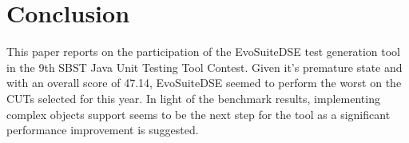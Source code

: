 \documentclass[conference]{IEEEtran}
\begin{document}
\section{Conclusion}
This paper reports on the participation of the EvoSuiteDSE test generation tool in the 9th SBST Java Unit Testing Tool Contest. Given it's premature state and with an overall score of 47.14, EvoSuiteDSE seemed to perform the worst on the CUTs selected for this year. In light of the benchmark results, implementing complex objects support seems to be the next step for the tool as a significant performance improvement is suggested.



%
%

\end{document}
